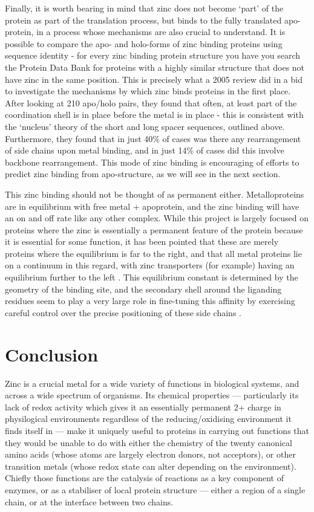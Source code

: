 Finally, it is worth bearing in mind that zinc does not become `part' of the protein as part of the translation process, but binds to the fully translated apo-protein, in a process whose mechanisms are also crucial to understand. It is possible to compare the apo- and holo-forms of zinc binding proteins using sequence identity - for every zinc binding protein structure you have you search the Protein Data Bank for proteins with a highly similar structure that does not have zinc in the same position. This is precisely what a 2005 review did \cite{babor2005flexibility} in a bid to investigate the mechanisms by which zinc binds proteins in the first place. After looking at 210 apo/holo pairs, they found that often, at least part of the coordination shell is in place before the metal is in place - this is consistent with the `nucleus' theory of the short and long spacer sequences, outlined above. Furthermore, they found that in just 40\% of cases was there any rearrangement of side chains upon metal binding, and in just 14\% of cases did this involve backbone rearrangement. This mode of zinc binding is encouraging of efforts to predict zinc binding from apo-structure, as we will see in the next section.

This zinc binding should not be thought of as permanent either. Metalloproteins are in equilibrium with free metal + apoprotein, and the zinc binding will have an on and off rate like any other complex. While this project is largely focused on proteins where the zinc is essentially a permanent feature of the protein because it is essential for some function, it has been pointed that these are merely proteins where the equilibrium is far to the right, and that all metal proteins lie on a continuum in this regard, with zinc transporters (for example) having an equilibrium further to the left \cite{maret2010metalloproteomics}. This equilibrium constant is determined by the geometry of the binding site, and the secondary shell around the liganding residues seem to play a very large role in fine-tuning this affinity by exercising careful control over the precise positioning of these side chains \cite{kochanczyk2015relationship}.

\section{Conclusion}

Zinc is a crucial metal for a wide variety of functions in biological systems, and across a wide spectrum of organisms. Its chemical properties --- particularly its lack of redox activity which gives it an essentially permanent 2+ charge in physilogical environments regardless of the reducing/oxidising environment it finds itself in --- make it uniquely useful to proteins in carrying out functions that they would be unable to do with either the chemistry of the twenty canonical amino acids (whose atoms are largely electron donors, not acceptors), or other transition metals (whose redox state can alter depending on the environment). Chiefly those functions are the catalysis of reactions as a key component of enzymes, or as a stabiliser of local protein structure --- either a region of a single chain, or at the interface between two chains.

